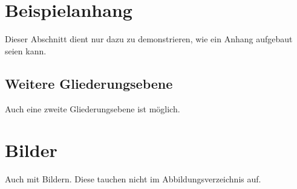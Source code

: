 \section{Beispielanhang}\label{Beispielanhang}
Dieser Abschnitt dient nur dazu zu demonstrieren, wie ein Anhang aufgebaut seien kann.
\subsection{Weitere Gliederungsebene}
Auch eine zweite Gliederungsebene ist möglich.
\section{Bilder}
Auch mit Bildern.
Diese tauchen nicht im Abbildungsverzeichnis auf.
